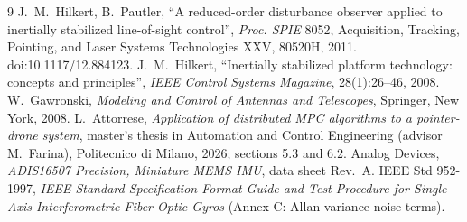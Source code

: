 \documentclass[10pt,a4paper]{article}
\numberwithin{equation}{section}
\begin{document}
\begin{thebibliography}{9}
 J.~M.~Hilkert, B.~Pautler, ``A reduced-order disturbance observer applied to inertially stabilized line-of-sight control'', \emph{Proc. SPIE} 8052, Acquisition, Tracking, Pointing, and Laser Systems Technologies XXV, 80520H, 2011. doi:10.1117/12.884123.
 J.~M.~Hilkert, ``Inertially stabilized platform technology: concepts and principles'', \emph{IEEE Control Systems Magazine}, 28(1):26--46, 2008.
 W.~Gawronski, \emph{Modeling and Control of Antennas and Telescopes}, Springer, New York, 2008.
 L.~Attorrese, \emph{Application of distributed MPC algorithms to a pointer-drone system}, master's thesis in Automation and Control Engineering (advisor M.~Farina), Politecnico di Milano, 2026; sections 5.3 and 6.2.
 Analog Devices, \emph{ADIS16507 Precision, Miniature MEMS IMU}, data sheet Rev.~A.
 IEEE Std 952-1997, \emph{IEEE Standard Specification Format Guide and Test Procedure for Single-Axis Interferometric Fiber Optic Gyros} (Annex C: Allan variance noise terms).
\end{thebibliography}
\end{document}
